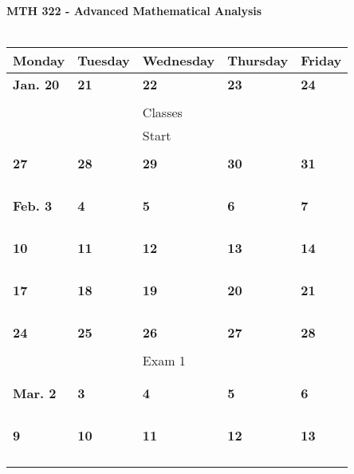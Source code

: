 \documentclass[letter, 12pt]{article}
\begin{document}
\begin{center}
{\bf MTH 322 - Advanced Mathematical Analysis}\\
\ \\
\begin{tabular}{|l|l|l|l|l|}
\hline
{\bf \phantom{xx}Monday\phantom{x}} & {\bf \phantom{xx}Tuesday\phantom{x}} & {\bf \phantom{x}Wednesday\phantom{}} & {\bf \phantom{x}Thursday\phantom{x}} & {\bf \phantom{xx}Friday\phantom{xx}} \\
\hline
\textbf{Jan. 20}&\textbf{21}&\textbf{22}&\textbf{23}&\textbf{24}\\
&  &  &  & \\
&  & Classes &  & \\
&  & Start &  & \\
&  &  &  & \\
\hline
\textbf{27}&\textbf{28}&\textbf{29}&\textbf{30}&\textbf{31}\\
&  &  &  & \\
&  &  &  & \\
&  &  &  & \\
&  &  &  & \\
\hline
\textbf{Feb. 3}&\textbf{4}&\textbf{5}&\textbf{6}&\textbf{7}\\
&  &  &  & \\
&  &  &  & \\
&  &  &  & \\
&  &  &  & \\
\hline
\textbf{10}&\textbf{11}&\textbf{12}&\textbf{13}&\textbf{14}\\
&  &  &  & \\
&  &  &  & \\
&  &  &  & \\
&  &  &  & \\
\hline
\textbf{17}&\textbf{18}&\textbf{19}&\textbf{20}&\textbf{21}\\
&  &  &  & \\
&  &  &  & \\
&  &  &  & \\
&  &  &  & \\
\hline
\textbf{24}&\textbf{25}&\textbf{26}&\textbf{27}&\textbf{28}\\
&  &  &  & \\
&  &Exam 1  &  & \\
&  &  &  & \\
&  &  &  & \\
\hline
\textbf{Mar. 2}&\textbf{3}&\textbf{4}&\textbf{5}&\textbf{6}\\
&  &  &  & \\
&  &  &  & \\
&  &  &  & \\
&  &  &  & \\
\hline
\textbf{9}&\textbf{10}&\textbf{11}&\textbf{12}&\textbf{13}\\
&  &  &  & \\
&  &  &  & \\
&  &  &  & \\
&  &  &  & \\
\hline
\end{tabular}
\end{center}
\end{document}
